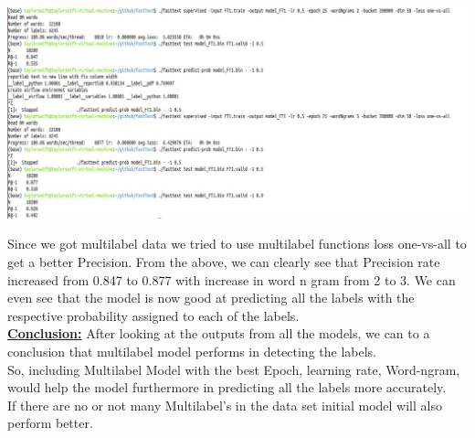 \documentclass[a4paper,1pt]{article}
\begin{document}
\begin{center}
	\begin{minipage}{\linewidth}
		\centering
		\includegraphics[width=1.0\linewidth]{"Precision and Recall at position 8"}
		
	\end{minipage}
\end{center}

\noindent Since we got multilabel data we tried to use multilabel functions loss one-vs-all to get a better Precision. From the above, we can clearly see that Precision rate increased from 0.847 to 0.877 with increase in word n gram from 2 to 3. We can even see that the model is now good at predicting all the labels with the respective probability assigned to each of the labels.\\



\noindent\textbf{\underline{Conclusion:}}
After looking at the outputs from all the models, we can to a conclusion that multilabel model performs in detecting the labels.\\
So, including Multilabel Model with the best Epoch, learning rate, Word-ngram, would help the model furthermore in predicting all the labels more accurately.\\
If there are no or not many Multilabel’s in the data set initial model will also perform better.
\end{document}
